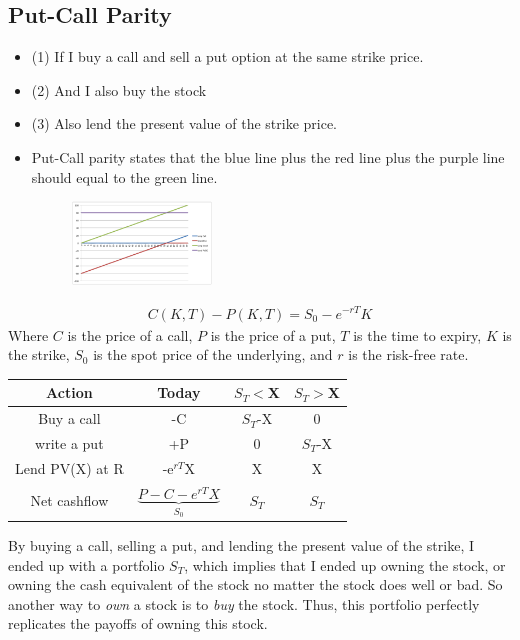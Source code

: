 \begin{multicols}{2}
\subsection{Put-Call Parity}
\begin{itemize}
    \item (1) If I buy a call and sell a put option at the same strike price. 
    \item (2) And I also buy the stock 
    \item (3) Also lend the present value of the strike price. 
    \item Put-Call parity states that the blue line plus the red line plus the purple line should equal to the green line. 
    \begin{figure}[H]
        \centering 
        \includegraphics[width =0.35\textwidth]{Figure/parity.png}
    \end{figure}
\end{itemize}
\begin{gather*}
    \boxed{C(K,T)-P(K,T) = S_0-e^{-rT}K}
\end{gather*}
Where $C$ is the price of a call, $P$ is the price of a put, $T$ is the time to expiry, $K$ is the strike, $S_0$ is the spot price of the underlying, and $r$ is the risk-free rate. 
\begin{table}[H]
    \begin{tabular}{c|c|c|c}
    Action & Today & $S_T<$X & $S_T>$X \\ \hline
    Buy a call & -C & $S_T$-X & 0 \\ 
    write a put & +P & 0 & $S_T$-X \\ 
    Lend PV(X) at R & -e$^{rT}$X & X & X \\
    Net cashflow & $\underbrace{P-C-e^{rT}X}_{S_0}$ & $S_T$ & $S_T$ \\
    \end{tabular}
\end{table}
\vspace*{-0.5cm}
By buying a call, selling a put, and lending the present value of the strike, I ended up with a portfolio $S_T$, which implies that I ended up owning the stock, or owning the cash equivalent of the stock no matter the stock does well or bad. So another way to \textit{own} a stock is to \textit{buy} the stock. Thus, this portfolio perfectly replicates the payoffs of owning this stock.


\end{multicols}
